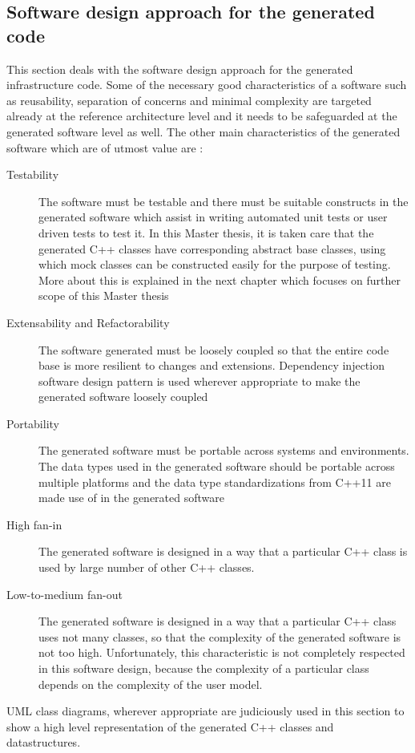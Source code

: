 \subsection{Software design approach for the generated code}
\label{subsection: Software design approach}
This section deals with the software design approach for the generated infrastructure code. Some of the necessary good characteristics of a software such as reusability, separation of concerns and minimal complexity are targeted already at the reference architecture level and it needs to be safeguarded at the generated software level as well. The other main characteristics of the generated software which are of utmost value are \cite{CodeComplete}:
\begin{description}
\item [Testability] The software must be testable and there must be suitable constructs in the generated software which assist in writing automated unit tests or user driven tests to test it. In this Master thesis, it is taken care that the generated C++ classes have corresponding abstract base classes, using which mock classes can be constructed easily for the purpose of testing. More about this is explained in the next chapter which focuses on further scope of this Master thesis
\item [Extensability and Refactorability] The software generated must be loosely coupled so that the entire code base is more resilient to changes and extensions. Dependency injection software design pattern \cite{InvOfCntrlurl} is used wherever appropriate to make the generated software loosely coupled
\item [Portability] The generated software must be portable across systems and environments. The data  types used in the generated software should be portable across multiple platforms and the data type standardizations from C++11 are made use of in the generated software
\item [High fan-in] The generated software is designed in a way that a particular C++ class is used by large number of other C++ classes.
\item [Low-to-medium fan-out] The generated software is designed in a way that a particular C++ class uses not many classes, so that the complexity of the generated software is not too high. Unfortunately, this characteristic is not completely respected in this software design, because the complexity of a particular class depends on the complexity of the user model.      
\end{description}
UML class diagrams, wherever appropriate are judiciously used in this section to show a high level representation of the generated C++ classes and datastructures. 

